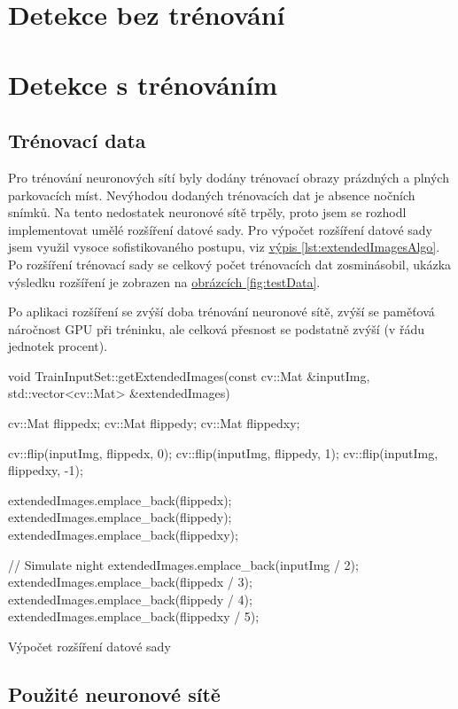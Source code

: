\documentclass[10pt,a4paper]{article}
\begin{document}
\section{Detekce bez trénování}
\section{Detekce s trénováním}
\subsection{Trénovací data}
Pro trénování neuronových sítí byly dodány trénovací obrazy prázdných a plných parkovacích míst. Nevýhodou dodaných trénovacích dat je absence nočních snímků. Na tento nedostatek neuronové sítě trpěly, proto jsem se rozhodl implementovat umělé rozšíření datové sady. Pro výpočet rozšíření datové sady jsem využil vysoce sofistikovaného postupu, viz \hyperref[lst:extendedImagesAlgo]{výpis \ref{lst:extendedImagesAlgo}}. Po rozšíření trénovací sady se celkový počet trénovacích dat zosminásobil, ukázka výsledku rozšíření je zobrazen na \hyperref[fig:testData]{obrázcích \ref{fig:testData}}. \par
Po aplikaci rozšíření se zvýší doba trénování neuronové sítě, zvýší se paměťová náročnost GPU při tréninku, ale celková přesnost se podstatně zvýší (v řádu jednotek procent).

\begin{listing}[ht]
\begin{c++code}
void TrainInputSet::getExtendedImages(const cv::Mat &inputImg,
std::vector<cv::Mat> &extendedImages) {
    cv::Mat flippedx;
    cv::Mat flippedy;
    cv::Mat flippedxy;

    cv::flip(inputImg, flippedx, 0);
    cv::flip(inputImg, flippedy, 1);
    cv::flip(inputImg, flippedxy, -1);

    extendedImages.emplace_back(flippedx);
    extendedImages.emplace_back(flippedy);
    extendedImages.emplace_back(flippedxy);

    // Simulate night
    extendedImages.emplace_back(inputImg / 2);
    extendedImages.emplace_back(flippedx / 3);
    extendedImages.emplace_back(flippedy / 4);
    extendedImages.emplace_back(flippedxy / 5);
  }
\end{c++code}
\caption{Výpočet rozšíření datové sady}
\label{lst:extendedImagesAlgo}
\end{listing}

\subsection{Použité neuronové sítě}
\end{document}
